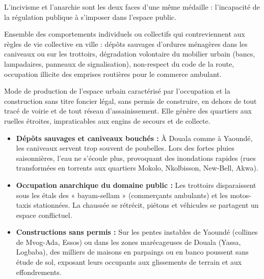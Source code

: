 \documentclass[11pt]{article}
\begin{document}
L'incivisme et l'anarchie sont les deux faces d'une même médaille : l'incapacité de la régulation publique à s'imposer dans l'espace public.

\begin{definition}
Ensemble des comportements individuels ou collectifs qui contreviennent aux règles de vie collective en ville : dépôts sauvages d'ordures ménagères dans les caniveaux ou sur les trottoirs, dégradation volontaire du mobilier urbain (bancs, lampadaires, panneaux de signalisation), non-respect du code de la route, occupation illicite des emprises routières pour le commerce ambulant.
\end{definition}

\begin{definition}
Mode de production de l'espace urbain caractérisé par l'occupation et la construction sans titre foncier légal, sans permis de construire, en dehors de tout tracé de voirie et de tout réseau d'assainissement. Elle génère des quartiers aux ruelles étroites, impraticables aux engins de secours et de collecte.
\end{definition}

\begin{itemize}
    \item \textbf{Dépôts sauvages et caniveaux bouchés :} À Douala comme à Yaoundé, les caniveaux servent trop souvent de poubelles. Lors des fortes pluies saisonnières, l'eau ne s'écoule plus, provoquant des inondations rapides (rues transformées en torrents aux quartiers Mokolo, Nkolbisson, New-Bell, Akwa).
    \item \textbf{Occupation anarchique du domaine public :} Les trottoirs disparaissent sous les étals des « bayam-sellam » (commerçants ambulants) et les motos-taxis stationnées. La chaussée se rétrécit, piétons et véhicules se partagent un espace conflictuel.
    \item \textbf{Constructions sans permis :} Sur les pentes instables de Yaoundé (collines de Mvog-Ada, Essos) ou dans les zones marécageuses de Douala (Yassa, Logbaba), des milliers de maisons en parpaings ou en banco poussent sans étude de sol, exposant leurs occupants aux glissements de terrain et aux effondrements.
\end{itemize}
\end{document}
